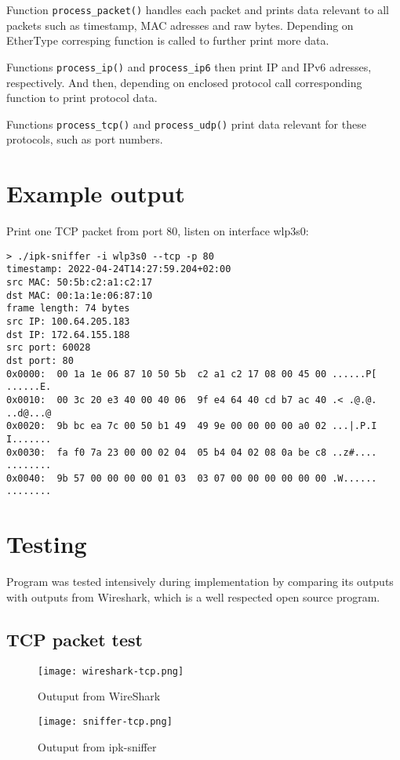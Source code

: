 \documentclass{article}
\begin{document}
Function \texttt{process\_packet()} handles each packet and prints data relevant
to all packets such as timestamp, MAC adresses and raw bytes. Depending on
EtherType corresping function is called to further print more data.

Functions \texttt{process\_ip()} and \texttt{process\_ip6} then print IP and
IPv6 adresses, respectively. And then, depending on enclosed protocol call
corresponding function to print protocol data.

Functions \texttt{process\_tcp()} and \texttt{process\_udp()} print data
relevant for these protocols, such as port numbers.

\section{Example output}
Print one TCP packet from port 80, listen on interface wlp3s0:
\begin{verbatim}
> ./ipk-sniffer -i wlp3s0 --tcp -p 80
timestamp: 2022-04-24T14:27:59.204+02:00
src MAC: 50:5b:c2:a1:c2:17
dst MAC: 00:1a:1e:06:87:10
frame length: 74 bytes
src IP: 100.64.205.183
dst IP: 172.64.155.188
src port: 60028
dst port: 80
0x0000:  00 1a 1e 06 87 10 50 5b  c2 a1 c2 17 08 00 45 00 ......P[ ......E.
0x0010:  00 3c 20 e3 40 00 40 06  9f e4 64 40 cd b7 ac 40 .< .@.@. ..d@...@
0x0020:  9b bc ea 7c 00 50 b1 49  49 9e 00 00 00 00 a0 02 ...|.P.I I.......
0x0030:  fa f0 7a 23 00 00 02 04  05 b4 04 02 08 0a be c8 ..z#.... ........
0x0040:  9b 57 00 00 00 00 01 03  03 07 00 00 00 00 00 00 .W...... ........
\end{verbatim}

\section{Testing}
Program was tested intensively during implementation by comparing its outputs
with outputs from Wireshark, which is a well respected open source program.

\subsection{TCP packet test}
\begin{figure}[ht]
    \centering
    \texttt{[image: wireshark-tcp.png]}
    \caption{Outuput from WireShark}
\end{figure}
\begin{figure}[ht]
    \centering
    \texttt{[image: sniffer-tcp.png]}
    \caption{Outuput from ipk-sniffer}
\end{figure}
\end{document}
